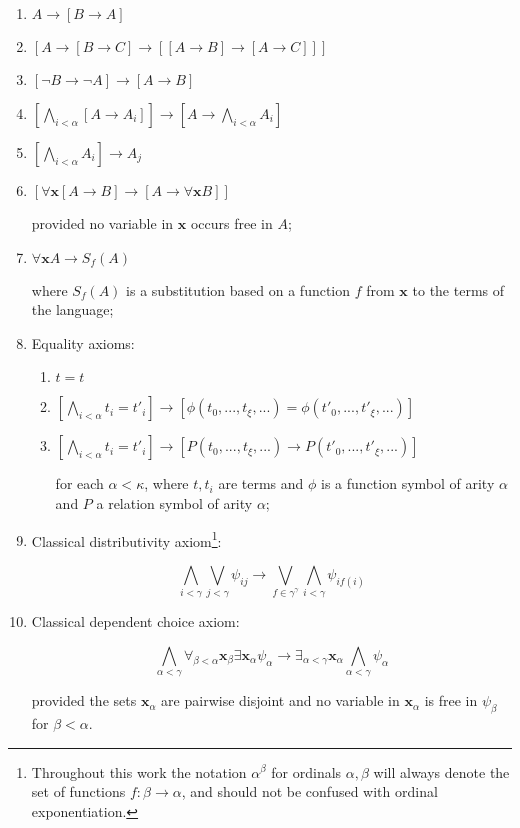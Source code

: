 \documentclass[a4paper,11pt]{article}
\theoremstyle{plain}
\theoremstyle{plain}
\theoremstyle{remark}
\begin{document}
\begin{enumerate}
 \item $A \to [B \to A]$
 \item $[A \to [B \to C] \to [[A \to B] \to [A \to C]]]$
 \item $[\neg B \to \neg A] \to [A \to B]$
 \item $[\bigwedge_{i<\alpha} [A \to A_i]] \to [A \to \bigwedge_{i<\alpha} A_i]$
 \item $[\bigwedge_{i<\alpha}  A_i] \to A_j$
 \item $[\forall \mathbf{x} [A \to B] \to [A \to \forall \mathbf{x} B]]$
 
 provided no variable in $\mathbf{x}$ occurs free in $A$;
 
 \item $\forall \mathbf{x} A \to S_f(A)$
 
 where $S_f(A)$ is a substitution based on a function $f$ from $\mathbf{x}$ to the terms of the language;
 
 \item Equality axioms:
 
 \begin{enumerate}
 \item $t=t$
 \item $[\bigwedge_{i<\alpha}t_i=t'_i] \to [\phi(t_0, ..., t_\xi, ...)=\phi(t'_0, ..., t'_\xi, ...)]$
 \item $[\bigwedge_{i<\alpha}t_i=t'_i] \to [P(t_0, ..., t_\xi, ...) \to P(t'_0, ..., t'_\xi, ...)]$
 
 for each $\alpha<\kappa$, where $t, t_i$ are terms and $\phi$ is a function symbol of arity $\alpha$ and $P$ a relation symbol of arity $\alpha$;
 \end{enumerate}
 
 \item Classical distributivity axiom\footnote{Throughout this work the notation $\alpha^{\beta}$ for ordinals $\alpha, \beta$ will always denote the set of functions $f: \beta \to \alpha$, and should not be confused with ordinal exponentiation.}:
 
 $$\bigwedge_{i<\gamma}\bigvee_{j<\gamma} \psi_{ij} \to \bigvee_{f \in \gamma^{\gamma}}\bigwedge_{i<\gamma} \psi_{if(i)}$$
 
 \item Classical dependent choice axiom:
 
 $$\bigwedge_{\alpha < \gamma} \forall_{\beta < \alpha}\mathbf{x}_{\beta} \exists \mathbf{x}_{\alpha} \psi_{\alpha} \to \exists_{\alpha < \gamma} \mathbf{x}_{\alpha} \bigwedge_{\alpha < \gamma} \psi_{\alpha}$$
 
 provided the sets $\mathbf{x}_{\alpha}$ are pairwise disjoint and no variable in $\mathbf{x}_{\alpha}$ is free in $\psi_{\beta}$ for $\beta<\alpha$.
 
\end{enumerate}
\end{document}
